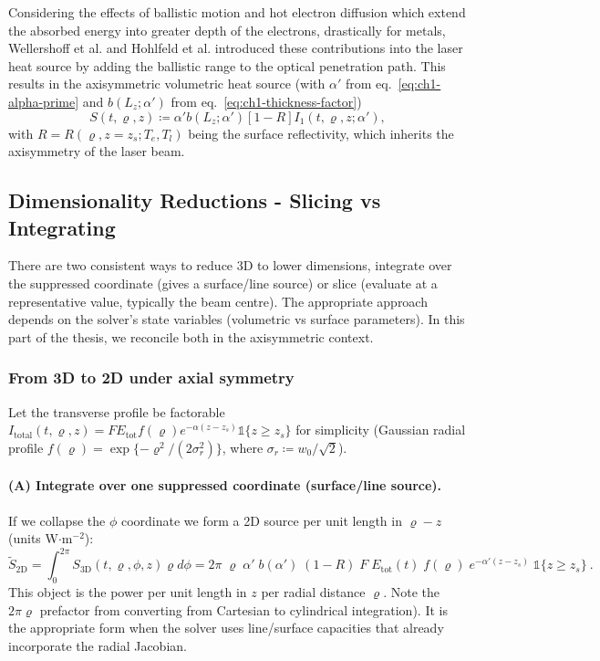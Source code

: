 Considering the effects of ballistic motion and hot electron diffusion which extend the absorbed energy into greater depth of the electrons, drastically for metals, Wellershoff et al. \cite{Wellershoff_1999} and Hohlfeld et al. \cite{Hohlfeld_2000} introduced these contributions into the laser heat source by adding the ballistic range to the optical penetration path.
This results in the axisymmetric volumetric heat source
(with $\alpha'$ from eq.~\eqref{eq:ch1-alpha-prime} and $b(L_z; \alpha')$ from eq.~\eqref{eq:ch1-thickness-factor})
\begin{equation}
  S(t, \varrho, z) \coloneqq \alpha' b(L_z; \alpha') [1 - R] I_1(t,\varrho,z; \alpha'),
  \label{eq:ch1-ulp_heat_source}
\end{equation}
with $R=R(\varrho, z=z_s; T_e, T_l)$ being the surface reflectivity, which inherits the axisymmetry of the laser beam.

\subsection{Dimensionality Reductions - Slicing vs Integrating}

There are two consistent ways to reduce 3D to lower dimensions, integrate over the suppressed coordinate
(gives a surface/line source) or slice (evaluate at a representative value, typically the beam centre).
The appropriate approach depends on the solver's state variables (volumetric vs surface parameters).
In this part of the thesis, we reconcile both in the axisymmetric context.

\subsubsection{From 3D to 2D under axial symmetry}

Let the transverse profile be factorable $I_\text{total}(t,\varrho,z) = F E_\text{tot}f(\varrho)e^{-\alpha(z-z_s)}\mathds{1}\{z \geq z_s\}$
for simplicity (Gaussian radial profile $f(\varrho) = \exp\{ -\varrho^2/(2\sigma_r^2) \}$, where $\sigma_r \coloneqq w_0/\sqrt{2}$).

\paragraph{(A) Integrate over one suppressed coordinate (surface/line source).}
If we collapse the $\phi$ coordinate we form a 2D source per unit length in $\varrho-z$ (units W$\cdot$m$^{-2}$):
\begin{equation}
  \widetilde{S}_\text{2D} = \int_{0}^{2\pi} S_\text{3D}(t, \varrho, \phi, z) \varrho d\phi = 2\pi \; \varrho \; \alpha' \; b(\alpha') \; (1-R) \; F \; E_\text{tot}(t) \; f(\varrho) \; e^{-\alpha'(z-z_s)} \; \mathds{1}\{z \geq z_s\}\ .
\end{equation}
This object is the power per unit length in $z$ per radial distance $\varrho$. Note the $2\pi\varrho$ prefactor from converting from Cartesian to cylindrical integration).
It is the appropriate form when the solver uses line/surface capacities that already incorporate the radial Jacobian.
\vspace{10pt}

